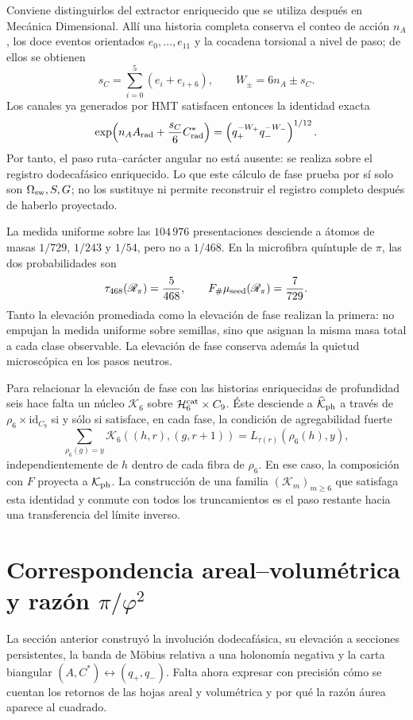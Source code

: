 Conviene distinguirlos del extractor enriquecido que se utiliza después en
Mecánica Dimensional. Allí una historia completa conserva el conteo de acción
\(n_A\), los doce eventos orientados \(e_0,\ldots,e_{11}\) y la cocadena
torsional a nivel de paso; de ellos se obtienen
\[
 s_C=\sum_{i=0}^{5}(e_i+e_{i+6}),
 \qquad
 W_\pm=6n_A\pm s_C.
\]
Los canales ya generados por HMT satisfacen entonces la identidad exacta
\[
 \exp\!\left(n_AA_{\rm rad}+\frac{s_C}{6}C^\ast_{\rm rad}\right)
 =\left(q_+^{-W_+}q_-^{-W_-}\right)^{1/12}.
\]
Por tanto, el paso ruta--carácter angular no está ausente: se realiza sobre
el registro dodecafásico enriquecido. Lo que este cálculo de fase prueba por sí
solo son \(\Omega_{\rm sw},S,G\); no los sustituye ni permite reconstruir el
registro completo después de haberlo proyectado.

La medida uniforme sobre las \(104\,976\) presentaciones desciende a átomos
de masas \(1/729\), \(1/243\) y \(1/54\), pero no a \(1/468\). En la
microfibra quíntuple de \(\pi\), las dos probabilidades son
\[
 \tau_{468}(\mathscr R_\pi)=\frac5{468},
 \qquad
 F_\#\mu_{\rm seed}(\mathscr R_\pi)=\frac7{729}.
\]
Tanto la elevación promediada como la elevación de fase realizan la primera: no
empujan la medida uniforme sobre semillas, sino que asignan la misma masa
total a cada clase observable. La elevación de fase conserva además la
quietud microscópica en los pasos neutros.

Para relacionar la elevación de fase con las historias enriquecidas de
profundidad seis hace falta un núcleo \(\mathcal K_6\) sobre
\(\mathcal H_6^{\rm cat}\times C_9\). Éste desciende a
\(\widehat{\mathcal K}_{\rm ph}\) a través de
\(\rho_6\times\mathrm{id}_{C_9}\) si y sólo si satisface, en cada fase, la
condición de agregabilidad fuerte
\[
 \sum_{\rho_6(g)=y}\mathcal K_6((h,r),(g,r+1))
 =L_{\tau(r)}(\rho_6(h),y),
\]
independientemente de \(h\) dentro de cada fibra de \(\rho_6\). En ese caso,
la composición con \(F\) proyecta a \(\mathcal K_{\rm ph}\). La construcción
de una familia \((\mathcal K_m)_{m\geq6}\) que satisfaga esta identidad y
conmute con todos los truncamientos es el paso restante hacia una
transferencia del límite inverso.


\section{Correspondencia areal–volumétrica y razón $\pi /\varphi ^2$}
\label{p12-83-c16-s3:sec:bisagra-hojas-pi-phi2}

La sección anterior construyó la involución dodecafásica, su elevación a
secciones persistentes, la banda de Möbius relativa a una holonomía negativa
y la carta biangular \((A,C^*)\leftrightarrow(q_+,q_-)\). Falta ahora
expresar con precisión cómo se cuentan los retornos de las hojas areal y
volumétrica y por qué la razón áurea aparece al cuadrado.

